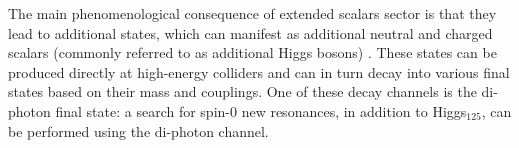\documentclass[a4paper, oneside, 11pt, openright]{book}
\begin{document}
		
		The main phenomenological consequence of extended scalars sector is that they lead to additional states, which can manifest as additional neutral and charged scalars (commonly referred to as additional Higgs bosons) \cite{ext_higgs}\cite{Englert_2014}. These states can be produced directly at high-energy colliders and can in turn decay into various final states based on their mass and couplings. One of these decay channels is the di-photon final state: a search for spin-0 new resonances, in addition to Higgs$_{125}$, can be performed using the di-photon channel. %
		
\end{document}
